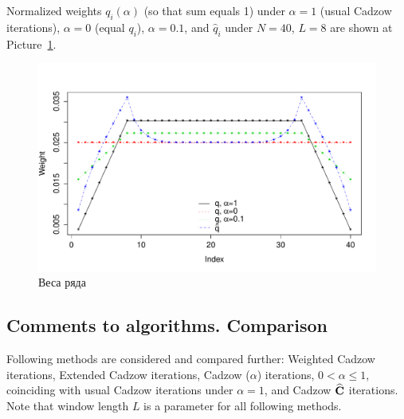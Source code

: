 \documentclass[12pt,a4paper,fleqn,leqno]{article}
\begin{document}
Normalized weights $q_i(\alpha)$ (so that sum equals 1) under $\alpha = 1$ (usual Cadzow iterations), $\alpha = 0$ (equal $q_i$), $\alpha = 0.1$,
 and $\hat{q}_i$ under $N = 40$, $L = 8$ are shown at Picture~\ref{img_weights}.
\begin{figure}[!h] \begin{center}
\includegraphics[width = \textwidth]{weights.pdf}\caption{Веса ряда}\label{img_weights}
\end{center}\end{figure}

\subsection{Comments to algorithms. Comparison}

Following methods are considered and compared further: Weighted Cadzow iterations, Extended Cadzow iterations, Cadzow ($\alpha$) iterations, $0< \alpha \leq 1$, coinciding with usual Cadzow iterations under $\alpha=1$,
and Cadzow $\widehat {\mathbf{C}}$ iterations.
Note that window length $L$ is a parameter for all following methods.
\end{document}
